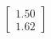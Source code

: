 \documentclass[preview]{standalone}
\begin{document}
\begin{align*}
\begin{bmatrix} 1.50 \\ 1.62 \end{bmatrix}
\end{align*}
\end{document}
